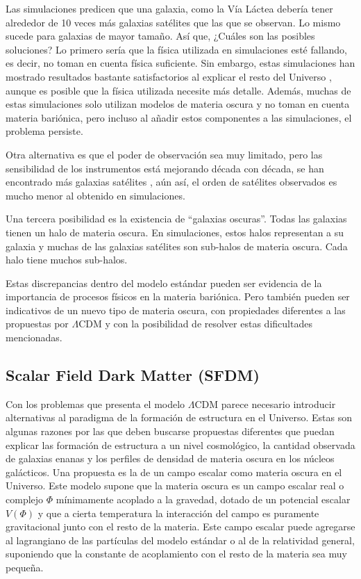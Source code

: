 \documentclass[a4paper,openright,12pt]{book}
\begin{document}
Las simulaciones predicen que una galaxia, como la Vía Láctea debería tener alrededor de 10 veces más galaxias satélites que las que se observan. Lo mismo sucede para galaxias de mayor tamaño. Así que, ¿Cuáles son las posibles soluciones? Lo primero sería que la física utilizada en simulaciones esté fallando, es decir, no toman en cuenta física suficiente. Sin embargo, estas simulaciones han mostrado resultados bastante satisfactorios al explicar el resto del Universo \cite{1.2.5}, aunque es posible que la física utilizada necesite más detalle. Además, muchas de estas simulaciones solo utilizan modelos de materia oscura y no toman en cuenta materia bariónica, pero incluso al añadir estos componentes a las simulaciones, el problema persiste.

Otra alternativa es que el poder de observación sea muy limitado, pero las sensibilidad de los instrumentos está mejorando década con década, se han encontrado más galaxias satélites \cite{1.2.6}, aún así, el orden de satélites observados es mucho menor al obtenido en simulaciones.

Una tercera posibilidad es la existencia de ``galaxias oscuras''. Todas las galaxias tienen un halo de materia oscura. En simulaciones, estos halos representan a su galaxia y muchas de las galaxias satélites son sub-halos de materia oscura. Cada halo tiene muchos sub-halos. 

Estas discrepancias dentro del modelo estándar pueden ser evidencia de la importancia de procesos físicos en la materia bariónica. Pero también pueden ser indicativos de un nuevo tipo de materia oscura, con propiedades diferentes a las propuestas por $\Lambda$CDM y con la posibilidad de resolver estas dificultades mencionadas.





\subsection{Scalar Field Dark Matter (SFDM)}
Con los problemas que presenta el modelo $\Lambda$CDM parece necesario introducir alternativas al paradigma de la formación de estructura en el Universo. Estas son algunas razones por las que deben buscarse propuestas diferentes que puedan explicar las formación de estructura a un nivel cosmológico, la cantidad observada de galaxias enanas y los perfiles de densidad de materia oscura en los núcleos galácticos.
Una propuesta es la de un campo escalar como materia oscura en el Universo. Este modelo supone que la materia oscura es un campo escalar real o complejo $\Phi$ mínimamente acoplado a la gravedad, dotado de un potencial escalar $V(\Phi)$ y que a cierta temperatura la interacción  del campo es puramente gravitacional junto con el resto de la materia. Este campo escalar puede agregarse al lagrangiano de las partículas del modelo estándar o al de la relatividad general, suponiendo que la constante de acoplamiento con el resto de la materia sea muy pequeña.
\end{document}
